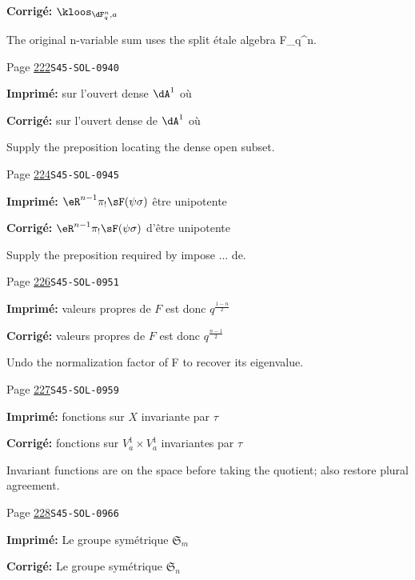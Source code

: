 \begin{description}
\par\noindent\textbf{Corrigé:} \(\kloos_{\dF_q^n,a}\)
\par\noindent The original n-variable sum uses the split étale algebra F\_q\textasciicircum{}n.
\smallskip
\item[\hypertarget{apparatus:FR-0234}{234}] Page \hyperlink{printpage:fr:222}{222}\quad\texttt{S45-SOL-0940}
\par\noindent\textbf{Imprimé:} sur l'ouvert dense $\dA^1$ où
\par\noindent\textbf{Corrigé:} sur l'ouvert dense de $\dA^1$ où
\par\noindent Supply the preposition locating the dense open subset.
\smallskip
\item[\hypertarget{apparatus:FR-0235}{235}] Page \hyperlink{printpage:fr:224}{224}\quad\texttt{S45-SOL-0945}
\par\noindent\textbf{Imprimé:} $\eR^{n-1} \pi_! \sF(\psi\sigma)$ être unipotente
\par\noindent\textbf{Corrigé:} $\eR^{n-1} \pi_! \sF(\psi\sigma)$ d'être unipotente
\par\noindent Supply the preposition required by impose ... de.
\smallskip
\item[\hypertarget{apparatus:FR-0236}{236}] Page \hyperlink{printpage:fr:226}{226}\quad\texttt{S45-SOL-0951}
\par\noindent\textbf{Imprimé:} valeurs propres de $F$ est donc $q^{\frac{1-n}{2}}$
\par\noindent\textbf{Corrigé:} valeurs propres de $F$ est donc $q^{\frac{n-1}{2}}$
\par\noindent Undo the normalization factor of F to recover its eigenvalue.
\smallskip
\item[\hypertarget{apparatus:FR-0237}{237}] Page \hyperlink{printpage:fr:227}{227}\quad\texttt{S45-SOL-0959}
\par\noindent\textbf{Imprimé:} fonctions sur $X$ invariante par $\tau$
\par\noindent\textbf{Corrigé:} fonctions sur $V_a^1\times V_a^1$ invariantes par $\tau$
\par\noindent Invariant functions are on the space before taking the quotient; also restore plural agreement.
\smallskip
\item[\hypertarget{apparatus:FR-0238}{238}] Page \hyperlink{printpage:fr:228}{228}\quad\texttt{S45-SOL-0966}
\par\noindent\textbf{Imprimé:} Le groupe symétrique $\mathfrak{S}_m$
\par\noindent\textbf{Corrigé:} Le groupe symétrique $\mathfrak{S}_n$

\end{description}
